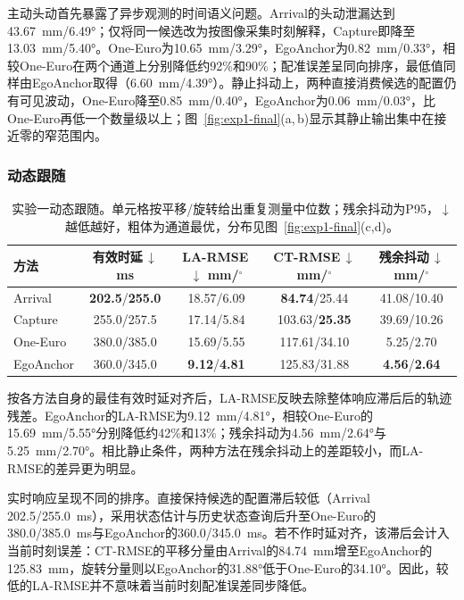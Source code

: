 \documentclass[review]{vgtc}
\begin{document}
主动头动首先暴露了异步观测的时间语义问题。Arrival的头动泄漏达到43.67~mm/6.49°；仅将同一候选改为按图像采集时刻解释，Capture即降至13.03~mm/5.40°。One-Euro为10.65~mm/3.29°，EgoAnchor为0.82~mm/0.33°，相较One-Euro在两个通道上分别降低约92\%和90\%；配准误差呈同向排序，最低值同样由EgoAnchor取得（6.60~mm/4.39°）。静止抖动上，两种直接消费候选的配置仍有可见波动，One-Euro降至0.85~mm/0.40°，EgoAnchor为0.06~mm/0.03°，比One-Euro再低一个数量级以上；图~\ref{fig:exp1-final}(a,\,b)显示其静止输出集中在接近零的窄范围内。

\subsubsection{动态跟随}

\begin{table}[t]
\centering
\caption{实验一动态跟随。单元格按平移/旋转给出重复测量中位数；残余抖动为P95，$\downarrow$越低越好，粗体为通道最优，分布见图~\ref{fig:exp1-final}(c,d)。}
\setlength{\tabcolsep}{2pt}
\begin{tabular}{@{}lcccc@{}}
\toprule
方法 & \shortstack{有效时延\,$\downarrow$\\ms} & \shortstack{LA-RMSE\,$\downarrow$\\mm/$^\circ$} & \shortstack{CT-RMSE\,$\downarrow$\\mm/$^\circ$} & \shortstack{残余抖动\,$\downarrow$\\mm/$^\circ$} \\
\midrule
Arrival & \textbf{202.5}/\textbf{255.0} & 18.57/6.09 & \textbf{84.74}/25.44 & 41.08/10.40 \\
Capture & 255.0/257.5 & 17.14/5.84 & 103.63/\textbf{25.35} & 39.69/10.26 \\
One-Euro & 380.0/385.0 & 15.69/5.55 & 117.61/34.10 & 5.25/2.70 \\
EgoAnchor & 360.0/345.0 & \textbf{9.12}/\textbf{4.81} & 125.83/31.88 & \textbf{4.56}/\textbf{2.64} \\
\bottomrule
\end{tabular}
\end{table}

按各方法自身的最佳有效时延对齐后，LA-RMSE反映去除整体响应滞后后的轨迹残差。EgoAnchor的LA-RMSE为9.12~mm/4.81°，相较One-Euro的15.69~mm/5.55°分别降低约42\%和13\%；残余抖动为4.56~mm/2.64°与5.25~mm/2.70°。相比静止条件，两种方法在残余抖动上的差距较小，而LA-RMSE的差异更为明显。

实时响应呈现不同的排序。直接保持候选的配置滞后较低（Arrival 202.5/255.0~ms），采用状态估计与历史状态查询后升至One-Euro的380.0/385.0~ms与EgoAnchor的360.0/345.0~ms。若不作时延对齐，该滞后会计入当前时刻误差：CT-RMSE的平移分量由Arrival的84.74~mm增至EgoAnchor的125.83~mm，旋转分量则以EgoAnchor的31.88°低于One-Euro的34.10°。因此，较低的LA-RMSE并不意味着当前时刻配准误差同步降低。
\end{document}
